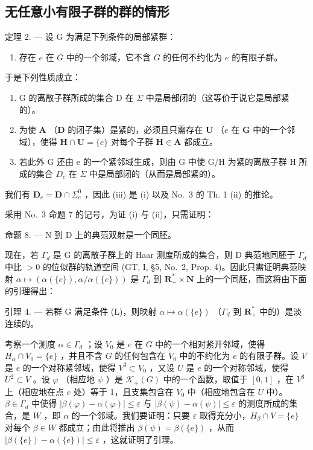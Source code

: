 \subsection{无任意小有限子群的群的情形}

定理 2. --- 设 G 为满足下列条件的局部紧群：

\begin{enumerate}
\def\labelenumi{(\Alph{enumi})}
\setcounter{enumi}{11}
\tightlist
\item
  存在 \(e\) 在 \(G\) 中的一个邻域，它不含 \(G\) 的任何不约化为 \(e\) 的有限子群。
\end{enumerate}

于是下列性质成立：

\begin{enumerate}
\def\labelenumi{(\roman{enumi})}
\item
  G 的离散子群所成的集合 D 在 \(\Sigma\) 中是局部闭的（这等价于说它是局部紧的）。
\item
  为使 \(\mathbf{A}\) （\(\mathbf{D}\) 的闭子集）是紧的，必须且只需存在 \(\mathbf{U}\) （\(e\) 在 \(\mathbf{G}\) 中的一个邻域），使得 \(\mathbf{H} \cap \mathbf{U} = \{e\}\) 对每个子群 \(\mathbf{H} \in \mathbf{A}\) 都成立。
\item
  若此外 G 还由 e 的一个紧邻域生成，则由 G 中使 G/H 为紧的离散子群 H 所成的集合 \(D_{c}\) 在 \(\Sigma\) 中是局部闭的（从而是局部紧的）。
\end{enumerate}

我们有 \(\mathbf{D}_c = \mathbf{D} \cap \Sigma_c^0\) ，因此 (iii) 是 (i) 以及 No.~3 的 Th. 1 (ii) 的推论。

采用 No.~3 命题 7 的记号，为证 (i) 与 (ii)，只需证明：

命题 8. --- N 到 D 上的典范双射是一个同胚。

现在，若 \(\Gamma_d\) 是 G 的离散子群上的 Haar 测度所成的集合，则 D 典范地同胚于 \(\Gamma_d\) 中比 \(>0\) 的位似群的轨道空间 (GT, I, §5, No.~2, Prop. 4)。因此只需证明典范映射 \(\alpha \mapsto (\alpha(\{e\}), \alpha/\alpha(\{e\}))\) 是 \(\Gamma_d\) 到 \(\mathbf{R}_+^* \times \mathbf{N}\) 上的一个同胚，而这将由下面的引理得出：

引理 4. --- 若群 G 满足条件 (L)，则映射 \(\alpha \mapsto \alpha (\{e\})\) （\(\Gamma_d\) 到 \(\mathbf{R}_+^*\) 中的）是淡连续的。

考察一个测度 \(\alpha \in \Gamma_d\) ；设 \(V_0\) 是 \(e\) 在 \(G\) 中的一个相对紧开邻域，使得 \(H_\alpha \cap V_0 = \{e\}\) ，并且不含 \(G\) 的任何包含在 \(V_0\) 中的不约化为 \(e\) 的有限子群。设 \(V\) 是 \(e\) 的一个对称紧邻域，使得 \(V^3 \subset V_0\) ，又设 \(U\) 是 \(e\) 的一个对称邻域，使得 \(U^2 \subset V\) 。设 \(\varphi\) （相应地 \(\psi\) ）是 \(\mathcal{K}_+(G)\) 中的一个函数，取值于 \([0,1]\) ，在 \(V^3\) 上（相应地在点 \(e\) 处）等于 1，且支集包含在 \(V_0\) 中（相应地包含在 \(U\) 中）。\(\beta \in \Gamma_d\) 中使得 \(|\beta(\varphi) - \alpha(\varphi)| \leqslant \varepsilon\) 与 \(|\beta(\psi) - \alpha(\psi)| \leqslant \varepsilon\) 的测度所成的集合，是 \(W\) ，即 \(\alpha\) 的一个邻域。我们要证明：只要 \(\varepsilon\) 取得充分小，\(H_\beta \cap V = \{e\}\) 对每个 \(\beta \in W\) 都成立；由此将推出 \(\beta(\psi) = \beta(\{e\})\) ，从而 \(|\beta(\{e\}) - \alpha(\{e\})| \leqslant \varepsilon\) ，这就证明了引理。

